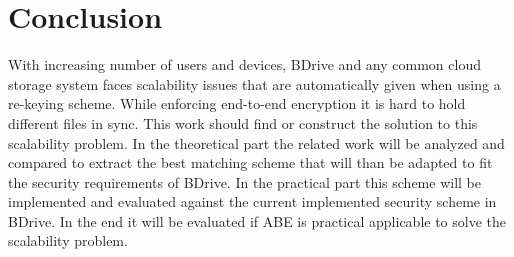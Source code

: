 \documentclass[twocolumn]{article}
\begin{document}



\section{Conclusion}
With increasing number of users and devices, BDrive and any common cloud storage system faces scalability issues that are automatically given when using a re-keying scheme. While enforcing end-to-end encryption it is hard to hold different files in sync. This work should find or construct the solution to this scalability problem. In the theoretical part the related work will be analyzed and compared to extract the best matching scheme that will than be adapted to fit the security requirements of BDrive. In the practical part this scheme will be implemented and evaluated against the current implemented security scheme in BDrive. In the end it will be evaluated if ABE is practical applicable to solve the scalability problem. 


 


\end{document}
